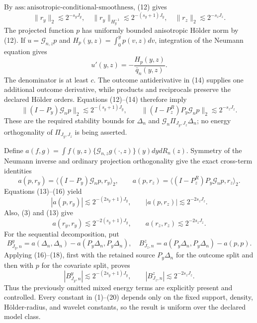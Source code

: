 By \(\mathrm{ass{:}anisotropic\text{-}conditional\text{-}smoothness}\), (12) gives
\[
\|r_y\|_2\lesssim2^{-s_yJ_y},
\quad \|r_y\|_{H_y^{-1}}\lesssim2^{-(s_y+1)J_y},
\quad \|r_z\|_2\lesssim2^{-s_zJ_z}.                            \tag{13}
\]
The projected function \(p\) has uniformly bounded anisotropic H\"older norm by (12). If \(u=\mathcal G_{n,z}p\) and \(H_p(y,z)=\int_0^yp(v,z)dv\), integration of the Neumann equation gives
\[
u'(y,z)=-\frac{H_p(y,z)}{\bar q_n(y,z)}.                         \tag{14}
\]
The denominator is at least \(c\). The outcome antiderivative in (14) supplies one additional outcome derivative, while products and reciprocals preserve the declared H\"older orders. Equations (12)--(14) therefore imply
\[
\|(I-P_y)\mathcal G_np\|_2\lesssim2^{-(s_y+1)J_y},
\qquad
\|(I-P_z^R)P_y\mathcal G_np\|_2\lesssim2^{-s_zJ_z}.            \tag{15}
\]
These are the required stability bounds for \(\Delta_n\) and \(\mathcal G_n\Pi_{J_y,J_z}\Delta_n\); no energy orthogonality of \(\Pi_{J_y,J_z}\) is being asserted.

Define \(a(f,g)=\int f(y,z)\{\mathcal G_{n,z}g(\cdot,z)\}(y)dydR_n(z)\). Symmetry of the Neumann inverse and ordinary projection orthogonality give the exact cross-term identities
\[
a(p,r_y)=\langle(I-P_y)\mathcal G_np,r_y\rangle_2,
\qquad
a(p,r_z)=\langle(I-P_z^R)P_y\mathcal G_np,r_z\rangle_2.          \tag{16}
\]
Equations (13)--(16) yield
\[
|a(p,r_y)|\lesssim2^{-(2s_y+1)J_y},
\qquad |a(p,r_z)|\lesssim2^{-2s_zJ_z}.                           \tag{17}
\]
Also, (3) and (13) give
\[
a(r_y,r_y)\lesssim2^{-2(s_y+1)J_y},
\qquad a(r_z,r_z)\lesssim2^{-2s_zJ_z}.                           \tag{18}
\]
For the sequential decomposition, put
\[
B^y_{J_y,n}=a(\Delta_n,\Delta_n)-a(P_y\Delta_n,P_y\Delta_n),
\quad
B^z_{J_z,n}=a(P_y\Delta_n,P_y\Delta_n)-a(p,p).                   \tag{19}
\]
Applying (16)--(18), first with the retained source \(P_y\Delta_n\) for the outcome split and then with \(p\) for the covariate split, proves
\[
|B^y_{J_y,n}|\lesssim2^{-(2s_y+1)J_y},
\qquad |B^z_{J_z,n}|\lesssim2^{-2s_zJ_z}.                        \tag{20}
\]
Thus the previously omitted mixed energy terms are explicitly present and controlled. Every constant in (1)--(20) depends only on the fixed support, density, H\"older-radius, and wavelet constants, so the result is uniform over the declared model class.